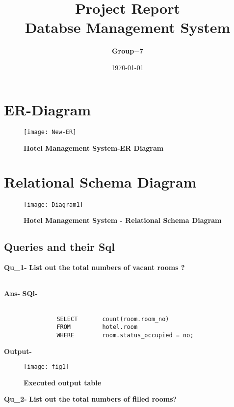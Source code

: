\documentclass[a4,12pt]{report}
\title{ Project Report \\
						\textbf{Databse Management System}}
\author{\textbf{Group$-$7}}
\date{\today}
\begin{document}
\maketitle


\section*{ER-Diagram}
\begin{figure}[hbtp]
\centering
\texttt{[image: New-ER]}
\caption{\textbf{{\color{red}Hotel Management System-ER Diagram}}}
\end{figure}

\newpage
\section*{Relational Schema Diagram}
\begin{figure}[hbtp]
\centering
\texttt{[image: Diagram1]} \\

\caption{\textbf{{\color{red}Hotel Management System - Relational Schema Diagram}}}
\end{figure}


\newpage
\begin{center}
 \section*{Queries and their Sql}
\end{center}

\textbf{Qu\_1-} \textbf{List out the total numbers of vacant rooms ?} \\\

\textbf{Ans-}  \textbf{SQl-} \\\

\begin{lstlisting}
			   SELECT		count(room.room_no)
			   FROM			hotel.room 
			   WHERE		room.status_occupied = no;
\end{lstlisting}
			
\textbf{Output-} \\			   
\begin{figure}[hbtp]
\centering
\texttt{[image: fig1]}
\caption{\textbf{{\color{red}Executed output table}}}
\end{figure}


\textbf{Qu\_2-} \textbf{List out the total numbers of filled rooms?}\\\
\end{document}
